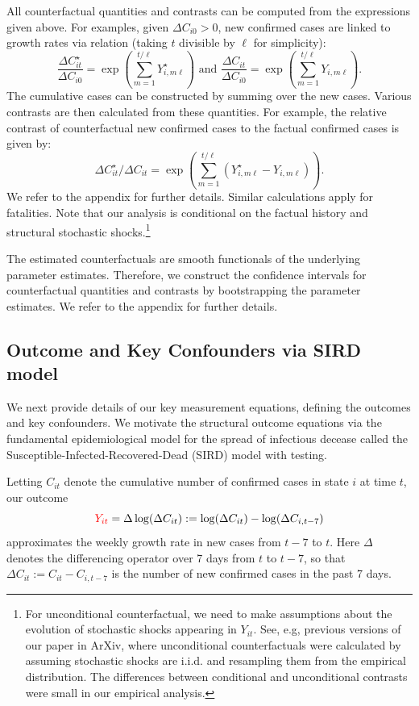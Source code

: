 \documentclass[3p, longtitle]{elsarticle}
\theoremstyle{definition}
\def\ycolor{\color{red}}
\begin{document}
All counterfactual quantities and contrasts can be computed from the expressions given
above. For examples, given $\Delta C_{i0}>0$, new confirmed cases are linked to growth rates via relation
(taking $t$ divisible by $\ell$ for simplicity):
$$
\frac{\Delta C^{\star}_{it}}{\Delta C_{i0}} = \exp\left (  \sum_{m=1}^{t/\ell}  Y^\star_{i,m\ell} \right) \text{ and }\frac{ \Delta C_{it}}{\Delta C_{i0}} = \exp
\left (  \sum_{m=1}^{t/\ell}   Y_{i, m \ell }\right).
$$
The cumulative cases can be constructed by summing over the new cases. Various contrasts are
then calculated from these quantities. For example, the relative contrast of counterfactual new confirmed cases
to the  factual confirmed cases is given by:
$$
\Delta C^{\star}_{it}/\Delta C_{it} = \exp\left(  \sum_{m=1}^{t/\ell} ( Y^\star_{i,m\ell} -  Y_{i,m \ell}) \right).
$$
We refer to the appendix for further details. Similar calculations apply for fatalities.
Note that our analysis is conditional on the factual history and structural stochastic
shocks.\footnote{For unconditional counterfactual,
we need to make assumptions about the evolution of stochastic shocks appearing in $Y_{it}$. See, e.g, previous
versions of our paper in ArXiv, where unconditional counterfactuals were calculated by assuming stochastic shocks
are i.i.d. and resampling them from the empirical distribution. The differences between conditional and unconditional
contrasts were small in our empirical analysis.}

The estimated counterfactuals are smooth functionals of the underlying parameter estimates. Therefore, we
construct the confidence intervals for counterfactual quantities and contrasts by bootstrapping the parameter
estimates. We refer to the appendix for further details.


\subsection{Outcome and Key Confounders via SIRD model}\label{sec:sirmodel} We next provide details
of our key measurement equations, defining the outcomes and key confounders. We motivate the structural
outcome equations via the fundamental epidemiological model for the spread of infectious decease called
the Susceptible-Infected-Recovered-Dead (SIRD) model with testing.

Letting $C_{it}$ denote the cumulative number of  confirmed cases in state $i$ at time $t$, our outcome
\begin{equation} \label{eq:y}
{\ycolor Y_{it}} =\Delta \log(\Delta C_{it}):= \log( \Delta C_{it} ) -
\log( \Delta C_{i,t-7})
\end{equation}
approximates the weekly growth rate in new cases from $t-7$ to $t$. Here $\Delta$ denotes the differencing operator over 7 days from $t$ to $t-7$, so that $\Delta C_{it}:=C_{it}-C_{i,t-7}$ is the number of new confirmed cases in the past 7 days.
\end{document}
